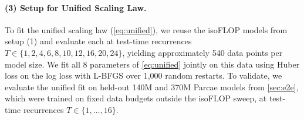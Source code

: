 \paragraph{(3) Setup for Unified Scaling Law.} To fit the unified scaling law (\cref{eq:unified}), we reuse the isoFLOP models from setup (1) and evaluate each at test-time recurrences $T \in \{1, 2, 4, 6, 8, 10, 12, 16, 20, 24\}$, yielding approximately 540 data points per model size. We fit all 8 parameters of \cref{eq:unified} jointly on this data using Huber loss on the log loss with L-BFGS over 1,000 random restarts. To validate, we evaluate the unified fit on held-out 140M and 370M Parcae models from \cref{sec:e2e}, which were trained on fixed data budgets outside the isoFLOP sweep, at test-time recurrences $T \in \{1, \ldots, 16\}$.
